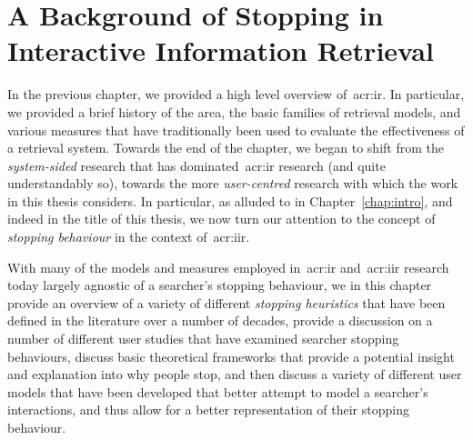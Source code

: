 
\chapter[A Background of Stopping in IIR]{A Background of Stopping in\\Interactive Information Retrieval}\label{chap:stopping_background}

In the previous chapter, we provided a high level overview of~\gls{acr:ir}. In particular, we provided a brief history of the area, the basic families of retrieval models, and various measures that have traditionally been used to evaluate the effectiveness of a retrieval system. Towards the end of the chapter, we began to shift from the \emph{system-sided} research that has dominated~\gls{acr:ir} research (and quite understandably so), towards the more \emph{user-centred} research with which the work in this thesis considers. In particular, as alluded to in Chapter~\ref{chap:intro}, and indeed in the title of this thesis, we now turn our attention to the concept of \emph{stopping behaviour} in the context of~\gls{acr:iir}.

\begin{figure}[h]
    \centering
    \vspace{4mm}
    \label{fig:stopsign}
    \vspace{-5mm}
\end{figure}

With many of the models and measures employed in~\gls{acr:ir} and~\gls{acr:iir} research today largely agnostic of a searcher's stopping behaviour, we in this chapter provide an overview of a variety of different \emph{stopping heuristics} that have been defined in the literature over a number of decades, provide a discussion on a number of different user studies that have examined searcher stopping behaviours, discuss basic theoretical frameworks that provide a potential insight and explanation into why people stop, and then discuss a variety of different user models that have been developed that better attempt to model a searcher's interactions, and thus allow for a better representation of their stopping behaviour.

